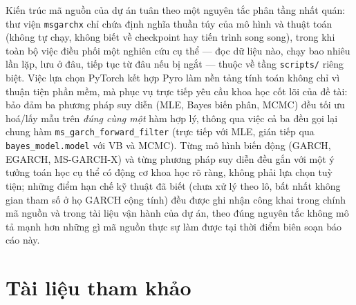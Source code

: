 \documentclass[11pt,a4paper]{article}
\newcommand{\code}[1]{\texttt{#1}}
\begin{document}
Kiến trúc mã nguồn của dự án tuân theo một nguyên tắc phân tầng nhất quán: thư viện
\code{msgarchx} chỉ chứa định nghĩa thuần túy của mô hình và thuật toán (không tự
chạy, không biết về checkpoint hay tiến trình song song), trong khi toàn bộ việc điều
phối một nghiên cứu cụ thể --- đọc dữ liệu nào, chạy bao nhiêu lần lặp, lưu ở đâu,
tiếp tục từ đâu nếu bị ngắt --- thuộc về tầng \code{scripts/} riêng biệt. Việc lựa
chọn PyTorch kết hợp Pyro làm nền tảng tính toán không chỉ vì thuận tiện phần mềm, mà
phục vụ trực tiếp yêu cầu khoa học cốt lõi của đề tài: bảo đảm ba phương pháp suy diễn
(MLE, Bayes biến phân, MCMC) đều tối ưu hoá/lấy mẫu trên \emph{đúng cùng một} hàm hợp
lý, thông qua việc cả ba đều gọi lại chung hàm \code{ms\_garch\_forward\_filter} (trực
tiếp với MLE, gián tiếp qua \code{bayes\_model.model} với VB và MCMC). Từng mô hình
biến động (GARCH, EGARCH, MS-GARCH-X) và từng phương pháp suy diễn đều gắn với một ý
tưởng toán học cụ thể có động cơ khoa học rõ ràng, không phải lựa chọn tuỳ tiện; những
điểm hạn chế kỹ thuật đã biết (chưa xử lý theo lô, bất nhất không gian tham số ở họ
GARCH cộng tính) đều được ghi nhận công khai trong chính mã nguồn và trong tài liệu
vận hành của dự án, theo đúng nguyên tắc không mô tả mạnh hơn những gì mã nguồn thực
sự làm được tại thời điểm biên soạn báo cáo này.

\section*{Tài liệu tham khảo}
\end{document}
